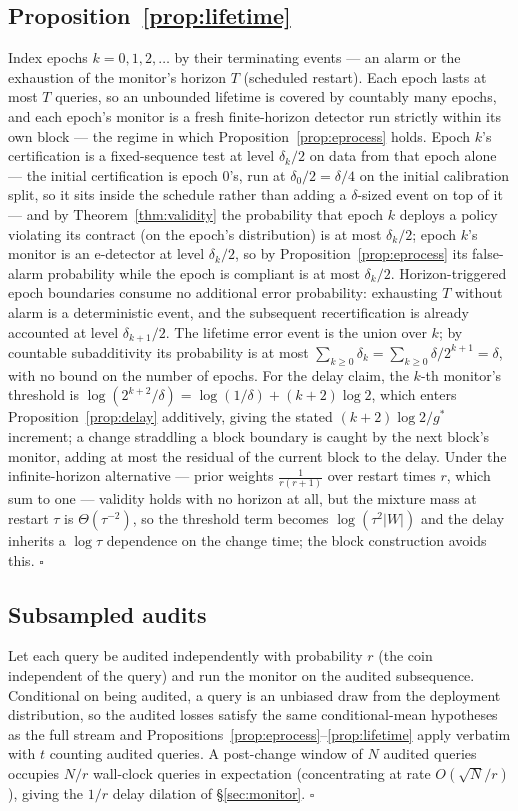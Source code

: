 \documentclass[sigconf,nonacm]{acmart}
\begin{document}
\subsection{Proposition~\ref{prop:lifetime}}
Index epochs $k = 0, 1, 2, \dots$ by their terminating events ---
an alarm or the exhaustion of the monitor's horizon $T$ (scheduled
restart). Each epoch lasts at most $T$ queries, so an unbounded
lifetime is covered by countably many epochs, and each epoch's monitor
is a fresh finite-horizon detector run strictly within its own block
--- the regime in which Proposition~\ref{prop:eprocess} holds. Epoch
$k$'s certification is a fixed-sequence test at level $\delta_k/2$ on
data from that epoch alone --- the initial certification is epoch 0's,
run at $\delta_0/2 = \delta/4$ on the initial calibration split, so it
sits inside the schedule rather than adding a $\delta$-sized event on
top of it --- and by Theorem~\ref{thm:validity} the
probability that epoch $k$ deploys a policy violating its contract (on
the epoch's distribution) is at most $\delta_k/2$; epoch $k$'s monitor
is an e-detector at level $\delta_k/2$, so by
Proposition~\ref{prop:eprocess} its false-alarm probability while the
epoch is compliant is at most $\delta_k/2$. Horizon-triggered epoch
boundaries consume no additional error probability: exhausting $T$
without alarm is a deterministic event, and the subsequent
recertification is already accounted at level $\delta_{k+1}/2$. The
lifetime error event is
the union over $k$; by countable subadditivity its probability is at
most $\sum_{k \ge 0} \delta_k = \sum_{k \ge 0} \delta/2^{k+1} =
\delta$, with no bound on the number of epochs. For the delay claim,
the $k$-th monitor's threshold is $\log(2^{k+2}/\delta) =
\log(1/\delta) + (k+2)\log 2$, which enters
Proposition~\ref{prop:delay} additively, giving the stated
$(k+2)\log 2 / g^\ast$ increment; a change straddling a block boundary
is caught by the next block's monitor, adding at most the residual of
the current block to the delay. Under the infinite-horizon alternative
--- prior weights $\frac{1}{r(r+1)}$ over restart times $r$, which sum
to one --- validity holds with no horizon at all, but the mixture mass
at restart $\tau$ is $\Theta(\tau^{-2})$, so the threshold term
becomes $\log(\tau^2|W|)$ and the delay inherits a $\log\tau$
dependence on the change time; the block construction avoids this.
\hfill$\square$

\subsection{Subsampled audits}
Let each query be audited independently with probability $r$ (the coin
independent of the query) and run the monitor on the audited
subsequence. Conditional on being audited, a query is an unbiased draw
from the deployment distribution, so the audited losses satisfy the
same conditional-mean hypotheses as the full stream and
Propositions~\ref{prop:eprocess}--\ref{prop:lifetime} apply verbatim
with $t$ counting audited queries. A post-change window of $N$ audited
queries occupies $N/r$ wall-clock queries in expectation (concentrating
at rate $O(\sqrt{N}/r)$), giving the $1/r$ delay dilation of
\S\ref{sec:monitor}. \hfill$\square$
\end{document}
